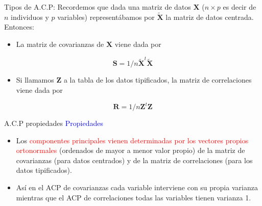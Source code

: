 \documentclass[
  ignorenonframetext,
]{beamer}
\providecommand{\tightlist}{%
  \setlength{\itemsep}{0pt}\setlength{\parskip}{0pt}}
\newcommand\blue[1]{\textcolor{blue}{#1}}
\newcommand\red[1]{\textcolor{red}{#1}}
\begin{document}
\begin{frame}{Tipos de A.C.P:}
\protect\hypertarget{tipos-de-a.c.p-1}{}
Recordemos que dada una matriz de datos \(\mathbf{X}\) (\(n\times p\) es
decir de \(n\) individuos y \(p\) variables) representábamos por
\(\tilde{\mathbf{X}}\) la matriz de datos centrada. Entonces:

\begin{itemize}
\tightlist
\item
  La matriz de covarianzas de \(\mathbf{X}\) viene dada por
\end{itemize}

\[\mathbf{S}=1/n \tilde{\mathbf{X}}^t\tilde{\mathbf{X}}\]

\begin{itemize}
\tightlist
\item
  Si llamamos \(\mathbf{Z}\) a la tabla de los datos tipificados, la
  matriz de correlaciones viene dada por
\end{itemize}

\[\mathbf{R}=1/n \mathbf{Z}^t\mathbf{Z}\]
\end{frame}

\begin{frame}{A.C.P propiedades}
\protect\hypertarget{a.c.p-propiedades}{}
\blue{Propiedades}

\begin{itemize}
\tightlist
\item
  Los
  \red{componentes principales vienen determinadas por los vectores propios ortonormales}
  (ordenados de mayor a menor valor propio) de la matriz de covarianzas
  (para datos centrados) y de la matriz de correlaciones (para los datos
  tipificados).
\item
  Así en el ACP de covarianzas cada variable interviene con su propia
  varianza mientras que el ACP de correlaciones todas las variables
  tienen varianza 1.
\end{itemize}
\end{frame}
\end{document}
